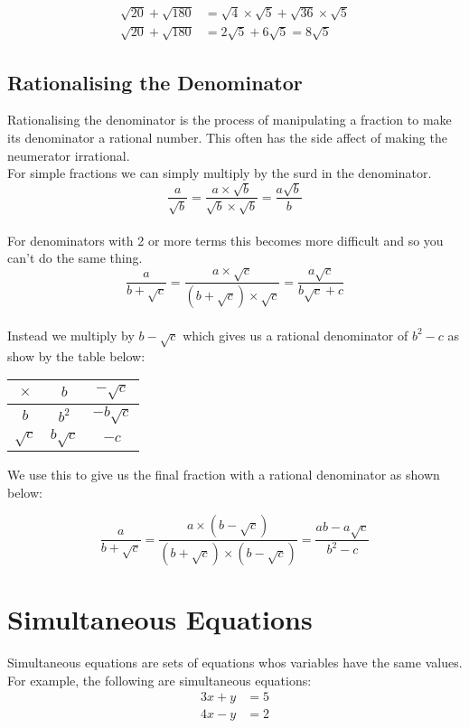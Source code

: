 \documentclass{article}
\begin{document}
\begin{align*}
	\sqrt{20} + \sqrt{180} &= \sqrt{4} \times \sqrt{5} + \sqrt{36} \times \sqrt{5}\\
	\sqrt{20} + \sqrt{180} &= 2\sqrt{5} + 6\sqrt{5} = 8\sqrt{5}
\end{align*}
\break
\subsection{Rationalising the Denominator}
Rationalising the denominator is the process of manipulating a fraction to make its denominator a rational number.
This often has the side affect of making the neumerator irrational.
\\
For simple fractions we can simply multiply by the surd in the denominator.
\begin{equation}
	\frac{a}{\sqrt{b}}=\frac{a \times \sqrt{b}}{\sqrt{b} \times \sqrt{b}}=\frac{a\sqrt{b}}{b}
\end{equation}
\\
For denominators with 2 or more terms this becomes more difficult and so you can't do the same thing.
\\
\begin{equation}
	\frac{a}{b + \sqrt{c}}=\frac{a \times \sqrt{c}}{(b + \sqrt{c}) \times \sqrt{c}}=\frac{a\sqrt{c}}{b\sqrt{c} + c}
\end{equation}
\\
Instead we multiply by $b - \sqrt{c}$ which gives us a rational denominator of $b^2 -c$ as show by the table below:

\begin{center}
	\begin{tabular}{ c | c | c }
		$\times$ & $b$ & $-\sqrt{c}$ \\ \hline
		$b$ & $b^2$ & $-b\sqrt{c}$ \\ \hline
		$\sqrt{c}$ & $b\sqrt{c}$ & $-c$
	\end{tabular}
\end{center}
We use this to give us the final fraction with a rational denominator as shown below:

\begin{equation}
	\frac{a}{b + \sqrt{c}}=\frac{a \times (b - \sqrt{c})}{(b + \sqrt{c}) \times (b - \sqrt{c})}=\frac{ab-a\sqrt{c}}{b^2 - c}
\end{equation}

\break
\section{Simultaneous Equations}
Simultaneous equations are sets of equations whos variables have the same values.
For example, the following are simultaneous equations:
\begin{align*}
	3x + y &= 5 \\
	4x - y &= 2
\end{align*}
\end{document}
